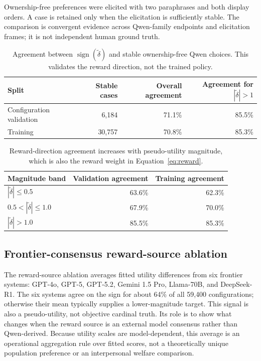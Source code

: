 \documentclass[11pt,letterpaper]{article}
\newcommand{\dd}{\widetilde{\delta}}
\begin{document}
Ownership-free preferences were elicited with two paraphrases and both display
orders. A case is retained only when the elicitation is sufficiently stable.
The comparison is convergent evidence across Qwen-family endpoints and
elicitation frames; it is not independent human ground truth.

\begin{table}[htbp]
\centering
\small
\begin{tabular}{lrrr}
\toprule
Split & Stable cases & Overall agreement & Agreement for $|\dd|>1$ \\
\midrule
Configuration validation & 6,184 & 71.1\% & 85.5\% \\
Training & 30,757 & 70.8\% & 85.3\% \\
\bottomrule
\end{tabular}
\caption{Agreement between $\operatorname{sign}(\dd)$ and stable
ownership-free Qwen choices. This validates the reward direction, not the
trained policy.}
\label{tab:anchor}
\end{table}

\begin{table}[htbp]
\centering
\small
\begin{tabular}{lrr}
\toprule
Magnitude band & Validation agreement & Training agreement \\
\midrule
$|\dd|\leq0.5$ & 63.6\% & 62.3\% \\
$0.5<|\dd|\leq1.0$ & 67.9\% & 70.0\% \\
$|\dd|>1.0$ & 85.5\% & 85.3\% \\
\bottomrule
\end{tabular}
\caption{Reward-direction agreement increases with pseudo-utility magnitude,
which is also the reward weight in Equation~\ref{eq:reward}.}
\label{tab:anchor-magnitude}
\end{table}

\FloatBarrier
\subsection{Frontier-consensus reward-source ablation}

The reward-source ablation averages fitted utility differences from six
frontier systems: GPT-4o, GPT-5, GPT-5.2, Gemini 1.5 Pro, Llama-70B, and
DeepSeek-R1. The six systems agree on the sign for about 64\% of all 59,400
configurations; otherwise their mean typically supplies a lower-magnitude target. This
signal is also a pseudo-utility, not objective cardinal truth. Its role is to
show what changes when the reward source is an external model consensus rather
than Qwen-derived. Because utility scales are model-dependent, this average is
an operational aggregation rule over fitted scores, not a theoretically unique
population preference or an interpersonal welfare comparison.
\end{document}
